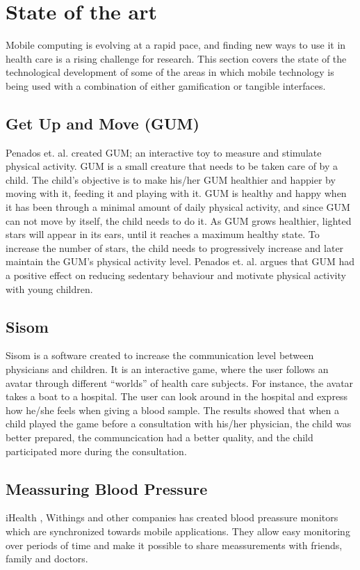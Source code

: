 \section{State of the art}
\label{sec:stateoftheart}
Mobile computing is evolving at a rapid pace, and finding new ways to use it in health care is a rising challenge for research. This section covers the state of the technological development of some of the areas in which mobile technology is being used with a combination of either gamification or tangible interfaces.   


\subsection{Get Up and Move (GUM)}
\label{sec:gum}
Penados et. al.\cite{penadosget} created GUM; an interactive toy to measure and stimulate physical activity. GUM is a small creature that needs to be taken care of by a child. The child's objective is to make his/her GUM healthier and happier by moving with it, feeding it and playing with it. GUM is healthy and happy when it has been through a minimal amount of daily physical activity, and since GUM can not move by itself, the child needs to do it. As GUM grows healthier, lighted stars will appear in its ears, until it reaches a maximum healthy state. To increase the number of stars, the child needs to progressively increase and later maintain the GUM's physical activity level. Penados et. al. argues that GUM had a positive effect on reducing sedentary behaviour and motivate physical activity with young children.


\subsection{Sisom}
Sisom is a software created to increase the communication level between physicians and children. It is an interactive game, where the user follows an avatar through different ``worlds'' of health care subjects. For instance, the avatar takes a boat to a hospital. The user can look around in the hospital and express how he/she feels when giving a blood sample. The results showed that when a child played the game before a consultation with his/her physician, the child was better prepared, the communcication had a better quality, and the child participated more during the consultation\cite{sisom-research}.


\subsection{Meassuring Blood Pressure}
iHealth , Withings and other companies has created blood preassure monitors which are synchronized towards mobile applications. They allow easy monitoring over periods of time and make it possible to share meassurements with friends, family and doctors.



